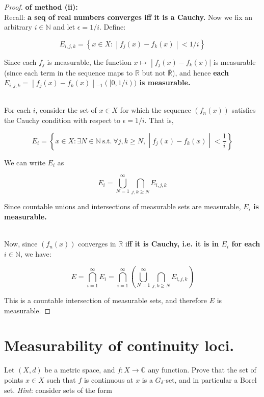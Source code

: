 \documentclass{qlnotes-export}
\begin{document}
\begin{proof}

\textbf{of method (ii):}\\
Recall: \textbf{a seq of real numbers converges iff it is a Cauchy.} Now we fix an arbitrary \(i \in {\mathbb{N}}\) and let \(\epsilon = 1/i\). Define:

\[E_{i,j,k} = \left\{ x \in X: \middle| f_{j}(x) - f_{k}(x) \middle| < 1/i \right\}\]

Since each \(f_{j}\) is measurable, the function \(\left. x\mapsto \middle| f_{j}(x) - f_{k}(x)| \right.\) is measurable (since each term in the sequence maps to \(\mathbb{R}\) but not \(\bar{\mathbb{R}}\)), and hence \textbf{each \(\left. E_{i,j,k} = \middle| f_{j}(x) - f_{k}(x) \middle| {}_{- 1}(\lbrack 0,1/i)) \right.\) is measurable.}\\
\strut \\
For each \(i\), consider the set of \(x \in X\) for which the sequence \((f_{n}(x))\) satisfies the Cauchy condition with respect to \(\epsilon = 1/i\). That is,

\[E_{i} = \left\{ x \in X:\exists N \in {\mathbb{N}}\ \text{s.t.}\ \forall j,k \geq N, \middle| f_{j}(x) - f_{k}(x) \middle| < \frac{1}{i} \right\}\]

We can write \(E_{i}\) as

\[E_{i} = \bigcup\limits_{N = 1}^{\infty}\bigcap\limits_{j,k \geq N}E_{i,j,k}\]

Since countable unions and intersections of measurable sets are measurable, \textbf{\(E_{i}\) is measurable.}\\
\strut \\
Now, since \((f_{n}(x))\) converges in \(\mathbb{R}\) i\textbf{ff it is Cauchy, i.e. it is in \(E_{i}\) for each \(i \in {\mathbb{N}}\)}, we have:

\[E = \bigcap\limits_{i = 1}^{\infty}E_{i} = \bigcap\limits_{i = 1}^{\infty}(\bigcup\limits_{N = 1}^{\infty}\bigcap\limits_{j,k \geq N}E_{i,j,k})\]

This is a countable intersection of measurable sets, and therefore \(E\) is measurable.

\end{proof}

\section{Measurability of continuity loci.}

Let \((X,d)\) be a metric space, and \(f:X\rightarrow{\mathbb{C}}\) any function. Prove that the set of points \(x \in X\) such that \(f\) is continuous at \(x\) is a \(G_{\delta}\)-set, and in particular a Borel set. \emph{Hint}: consider sets of the form
\end{document}
